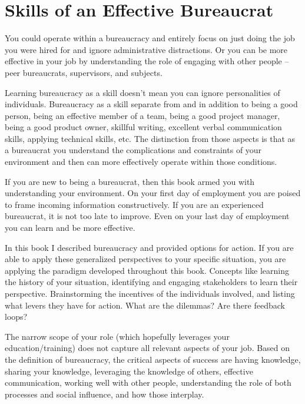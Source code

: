 \chapter{Skills of an Effective Bureaucrat\label{sec:last-chapter}}

You could operate within a bureaucracy and entirely focus on just doing the job you were hired for and ignore administrative distractions. Or you can be more effective in your job by understanding the role of engaging with other people -- peer bureaucrats, supervisors, and subjects. 

Learning bureaucracy as a skill doesn't mean you can ignore personalities of individuals. Bureaucracy as a skill separate from and in addition to being a good person, being an effective member of a team, being a good project manager, being a good product owner, skillful writing, excellent verbal communication skills, applying technical skills, etc. The distinction from those aspects is that as a bureaucrat you understand the complications and constraints of your environment and then can more effectively operate within those conditions.

If you are new to being a bureaucrat, then this book armed you with understanding your environment. On your first day of employment you are poised to frame incoming information constructively.
If you are an experienced bureaucrat, it is not too late to improve. Even on your last day of employment you can learn and be more effective.

In this book I described bureaucracy and provided options for action. If you are able to apply these generalized perspectives to your specific situation, you are applying the paradigm developed throughout this book. Concepts like learning the history of your situation, identifying and engaging stakeholders to learn their perspective. Brainstorming the incentives of the individuals involved, and listing what levers they have for action. What are the dilemmas? Are there feedback loops?



The narrow scope of your role (which hopefully leverages your education/training) does not capture all relevant aspects of your job. 
Based on the definition of \gls{bureaucracy}, the critical aspects of success are having knowledge, sharing your knowledge, leveraging the knowledge of others, effective communication, working well with other people, understanding the role of both processes and social influence, and how those interplay. 

